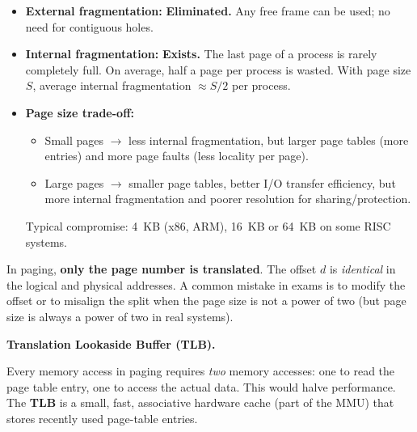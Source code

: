 \documentclass[11pt]{article}
\begin{document}
\begin{propriete}
\begin{itemize}
    \item \textbf{External fragmentation:} \textbf{Eliminated.} Any free frame can be used; no need for contiguous holes.
    \item \textbf{Internal fragmentation:} \textbf{Exists.} The last page of a process is rarely completely full. On average, half a page per process is wasted. With page size $S$, average internal fragmentation $\approx S/2$ per process.
    \item \textbf{Page size trade-off:} 
    \begin{itemize}
        \item Small pages $\to$ less internal fragmentation, but larger page tables (more entries) and more page faults (less locality per page).
        \item Large pages $\to$ smaller page tables, better I/O transfer efficiency, but more internal fragmentation and poorer resolution for sharing/protection.
    \end{itemize}
    Typical compromise: \SI{4}{KB} (x86, ARM), \SI{16}{KB} or \SI{64}{KB} on some RISC systems.
\end{itemize}
\end{propriete}

\begin{attention}
In paging, \textbf{only the page number is translated}. The offset $d$ is \emph{identical} in the logical and physical addresses. A common mistake in exams is to modify the offset or to misalign the split when the page size is not a power of two (but page size is always a power of two in real systems).
\end{attention}

\textbf{Translation Lookaside Buffer (TLB).}\par
Every memory access in paging requires \emph{two} memory accesses: one to read the page table entry, one to access the actual data. This would halve performance. The \textbf{TLB} is a small, fast, associative hardware cache (part of the MMU) that stores recently used page-table entries.
\end{document}
